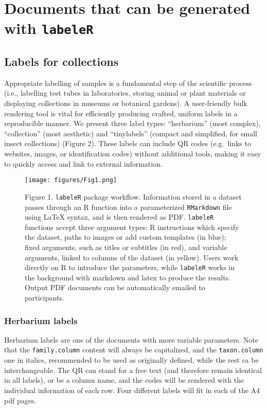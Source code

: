 \documentclass[10pt,a4paper,onecolumn]{article}
\begin{document}
\section{\texorpdfstring{Documents that can be generated with
\texttt{labeleR}}{Documents that can be generated with labeleR}}\label{documents-that-can-be-generated-with-labeler}

\subsection{Labels for collections}\label{labels-for-collections}

Appropriate labelling of samples is a fundamental step of the scientific
process (i.e., labelling test tubes in laboratories, storing animal or
plant materials or displaying collections in museums or botanical
gardens). A user-friendly bulk rendering tool is vital for efficiently
producing crafted, uniform labels in a reproducible manner. We present
three label types: ``herbarium'' (most complex), ``collection'' (most
aesthetic) and ``tinylabels'' (compact and simplified, for small insect
collections) (Figure 2). These labels can include QR codes (e.g.~links
to websites, images, or identification codes) without additional tools,
making it easy to quickly access and link to external information.

\begin{figure}
\centering
\texttt{[image: figures/Fig1.png]}
\caption{Figure 1. \texttt{labeleR} package workflow. Information stored
in a dataset passes through an R function into a parameterized
\texttt{RMarkdown} file using LaTeX syntax, and is then rendered as PDF.
\texttt{labeleR} functions accept three argument types: R instructions
which specify the dataset, paths to images or add custom templates (in
blue); fixed arguments, such as titles or subtitles (in red), and
variable arguments, linked to columns of the dataset (in yellow). Users
work directly on R to introduce the parameters, while \texttt{labeleR}
works in the background with markdown and latex to produce the results.
Output PDF documents can be automatically emailed to participants.}
\end{figure}

\subsubsection{Herbarium labels}\label{herbarium-labels}

Herbarium labels are one of the documents with more variable parameters.
Note that the \texttt{family.column} content will always be capitalized,
and the \texttt{taxon.column} one in italics, recommended to be used as
originally defined, while the rest ca be interchangeable. The QR can
stand for a free text (and therefore remain identical in all labels), or
be a column name, and the codes will be rendered with the individual
information of each row. Four different labels will fit in each of the
A4 pdf pages.
\end{document}
